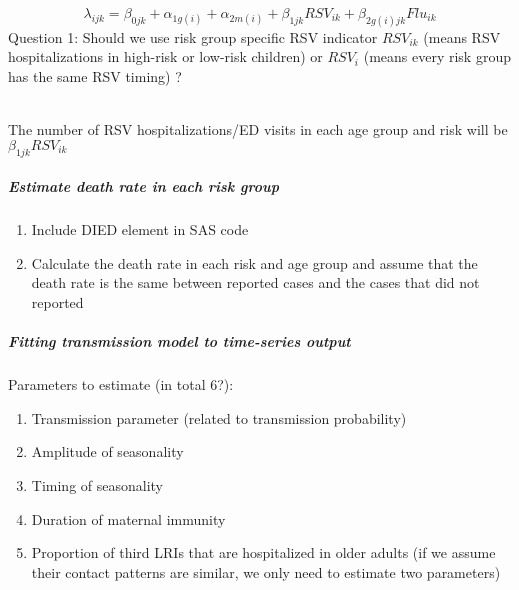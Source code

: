 \documentclass[
]{article}
\providecommand{\tightlist}{%
  \setlength{\itemsep}{0pt}\setlength{\parskip}{0pt}}
\begin{document}
\[\lambda_{ijk}=\beta_{0jk}+\alpha_{1g(i)}+\alpha_{2m(i)}+\beta_{1jk}RSV_{ik}+\beta_{2g(i)jk}Flu_{ik}\]
{Question 1: Should we use risk group specific RSV indicator
\(RSV_{ik}\)} (means RSV hospitalizations in high-risk or low-risk
children) or{ \(RSV_{i}\) } (means every risk group has the same RSV
timing) ?\\
\strut \\
The number of RSV hospitalizations/ED visits in each age group and risk
will be {\(\beta_{1jk}RSV_{ik}\)}

\hypertarget{estimate-death-rate-in-each-risk-group}{%
\subparagraph{Estimate death rate in each risk
group}\label{estimate-death-rate-in-each-risk-group}}

\begin{enumerate}
\def\labelenumi{(\arabic{enumi})}
\tightlist
\item
  Include DIED element in SAS code
\item
  Calculate the death rate in each risk and age group and assume that
  the death rate is the same between reported cases and the cases that
  did not reported
\end{enumerate}

\hypertarget{fitting-transmission-model-to-time-series-output}{%
\subparagraph{Fitting transmission model to time-series
output}\label{fitting-transmission-model-to-time-series-output}}

Parameters to estimate (in total 6?):

\begin{enumerate}
\def\labelenumi{(\arabic{enumi})}
\tightlist
\item
  Transmission parameter (related to transmission probability)
\item
  Amplitude of seasonality
\item
  Timing of seasonality
\item
  Duration of maternal immunity
\item
  Proportion of third LRIs that are hospitalized in older adults (if we
  assume their contact patterns are similar, we only need to estimate
  two parameters)
\end{enumerate}
\end{document}
